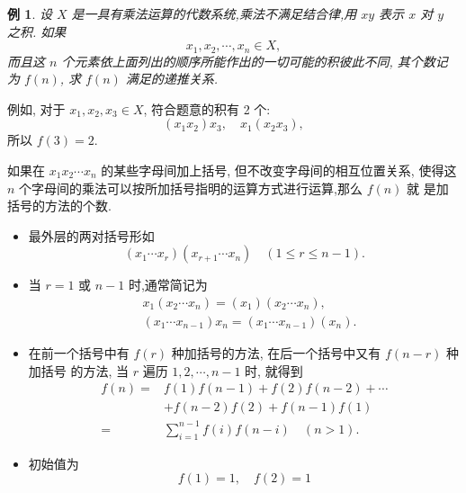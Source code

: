 \documentclass[punct]{ctexbeamer}
\newtheorem{ex}{例}[section]
\def\sol{\noindent {\bf 解\ }}
\begin{document}
\begin{frame}
	\begin{ex}
		设 $X$ 是一具有乘法运算的代数系统,乘法不满足结合律,用 $x y$ 表示 $x$ 对 $y$ 之积. 如果
		$$
		x_1, x_2, \cdots, x_n \in X,
		$$
		而且这 $n$ 个元素依上面列出的顺序所能作出的一切可能的积彼此不同, 其个数记 为 $f(n)$, 求 $f(n)$ 满足的递推关系.
	\end{ex}
\pause\sol 例如, 对于 $x_1, x_2, x_3 \in X$, 符合题意的积有 2 个:
$$
\left(x_1 x_2\right) x_3, \quad x_1\left(x_2 x_3\right),
$$
所以 $f(3)=2$.

如果在 $x_1 x_2 \cdots x_n$ 的某些字母间加上括号, 但不改变字母间的相互位置关系, 使得这 $n$ 个字母间的乘法可以按所加括号指明的运算方式进行运算,那么 $f(n)$ 就 是加括号的方法的个数.
\end{frame}
\begin{frame}
	\begin{itemize}
		\item 最外层的两对括号形如
		$$
		\left(x_1 \cdots x_r\right)\left(x_{r+1} \cdots x_n\right) \quad(1 \leqslant r \leqslant n-1).
		$$
		\item 当 $r=1$ 或 $n-1$ 时,通常简记为
		$$
		\begin{aligned}
			&x_1\left(x_2 \cdots x_n\right)=\left(x_1\right)\left(x_2 \cdots x_n\right), \\
			&\left(x_1 \cdots x_{n-1}\right) x_n=\left(x_1 \cdots x_{n-1}\right)\left(x_n\right) .
		\end{aligned}
		$$
		\item 在前一个括号中有 $f(r)$ 种加括号的方法, 在后一个括号中又有 $f(n-r)$ 种加括号 的方法, 当 $r$ 遍历 $1,2, \cdots, n-1$ 时, 就得到
		$$
		\begin{aligned}
			f(n)=& f(1) f(n-1)+f(2) f(n-2)+\cdots \\
			&+f(n-2) f(2)+f(n-1) f(1) \\
			=& \sum_{i=1}^{n-1} f(i) f(n-i) \quad(n>1) .
		\end{aligned}
		$$
		\item 初始值为
		$$
		f(1)=1, \quad f(2)=1
		$$
	\end{itemize}
\end{frame}
\end{document}
